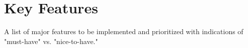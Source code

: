 \section{Key Features}
A list of major features to be implemented and prioritized with indications of "must-have" vs. "nice-to-have."
